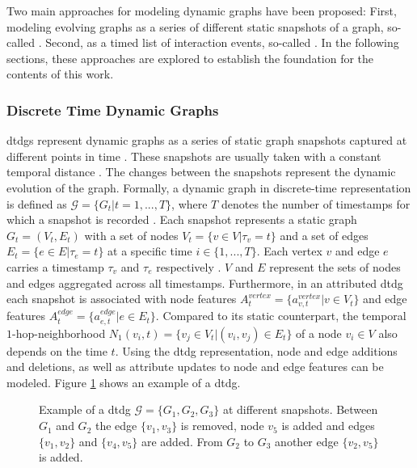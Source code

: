 Two main approaches for modeling dynamic graphs have been proposed: First, modeling evolving graphs as a series of different static snapshots of a graph, so-called  \cite{he_explainer_2022, xie_explaining_2022}. Second, as a timed list of interaction events, so-called  \cite{rossi_temporal_2020, trivedi_dyrep_2019}. In the following sections, these approaches are explored to establish the foundation for the contents of this work.

\subsubsection{Discrete Time Dynamic Graphs}
\label{s_Background_Graphs_DTDGs}
\glspl{dtdg} represent dynamic graphs as a series of static graph snapshots captured at different points in time \cite{rossi_temporal_2020}. These snapshots are usually taken with a constant temporal distance \cite{souza_provably_2022}. The changes between the snapshots represent the dynamic evolution of the graph. Formally, a dynamic graph in discrete-time representation is defined as $\mathcal{G} = \{G_t | t = 1,...,T\}$, where $T$ denotes the number of timestamps for which a snapshot is recorded \cite{you_roland_2022}. Each snapshot represents a static graph $G_t = (V_t, E_t)$ with a set of nodes $V_t = \{v \in V | \tau_v = t\}$ and a set of edges $E_t = \{e \in E | \tau_e = t\}$ at a specific time $i \in \{1, ..., T\}$. Each vertex $v$ and edge $e$ carries a timestamp $\tau_v$ and $\tau_e$ respectively \cite{you_roland_2022}. $V$ and $E$ represent the sets of nodes and edges aggregated across all timestamps. Furthermore, in an attributed \gls{dtdg} each snapshot is associated with node features $A_t^{vertex} = \{a_{v,t}^{vertex} | v \in V_t\}$ and edge features $A_t^{edge} = \{a_{e,t}^{edge} | e \in E_t\}$. Compared to its static counterpart, the temporal $1$-hop-neighborhood $N_1(v_i, t) = \{v_j \in V_t | (v_i, v_j) \in E_t\}$ of a node $v_i \in V$ also depends on the time $t$. Using the \gls{dtdg} representation, node and edge additions and deletions, as well as attribute updates to node and edge features can be modeled. Figure \ref{f_dtdg} shows an example of a \gls{dtdg}.


\begin{figure}[h]
    
    \caption{Example of a \gls{dtdg} $\mathcal{G}=\{G_1, G_2, G_3\}$ at different snapshots. Between $G_1$ and $G_2$ the edge $\{v_1, v_3\}$ is removed, node $v_5$ is added and edges $\{v_1, v_2\}$ and $\{v_4, v_5\}$ are added. From $G_2$ to $G_3$ another edge $\{v_2, v_5\}$ is added.}
    \label{f_dtdg}
\end{figure}

